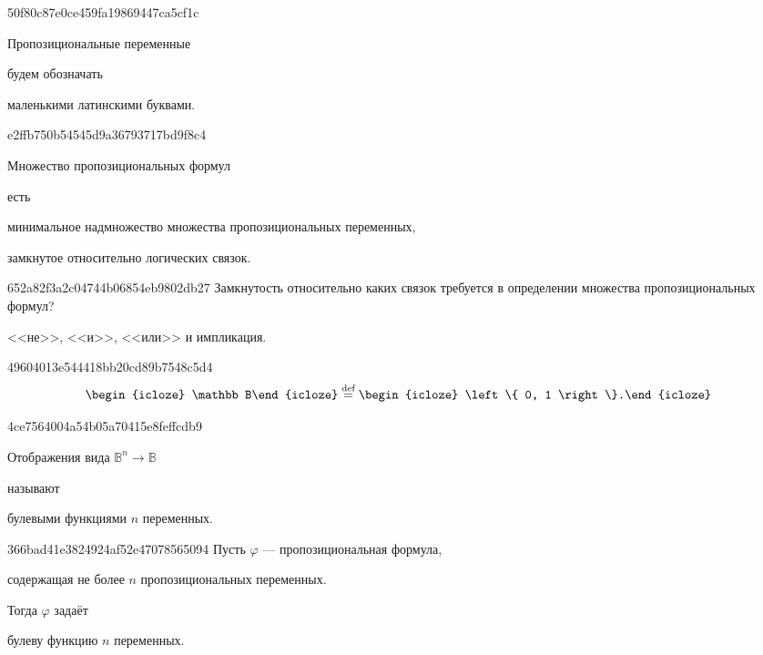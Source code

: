 \begin{note}{50f80c87e0ce459fa19869447ca5cf1c}
    \begin{icloze}{2}Пропозициональные переменные\end{icloze} будем обозначать \begin{icloze}{1}маленькими латинскими буквами.\end{icloze}
\end{note}

\begin{note}{e2ffb750b54545d9a36793717bd9f8c4}
    \begin{icloze}{3}Множество пропозициональных формул\end{icloze} есть \begin{icloze}{2}минимальное надмножество множества пропозициональных переменных,\end{icloze} \begin{icloze}{1}замкнутое относительно логических связок.\end{icloze}
\end{note}

\begin{note}{652a82f3a2c04744b06854eb9802db27}
    Замкнутость относительно каких связок требуется в определении множества пропозициональных формул?

    \begin{cloze}{1}
        <<не>>, <<и>>, <<или>> и импликация.
    \end{cloze}
\end{note}

\begin{note}{49604013e544418bb20cd89b7548c5d4}
    \[
        \begin{icloze}{2}\mathbb B\end{icloze} \overset{\text{def}}= \begin{icloze}{1}\left\{ 0, 1 \right\}.\end{icloze}
    \]
\end{note}

\begin{note}{4ce7564004a54b05a70415e8feffcdb9}
    \begin{icloze}{2}Отображения вида \({ \mathbb B^{n} \to \mathbb B }\)\end{icloze} называют \begin{icloze}{1}булевыми функциями \({ n }\) переменных.\end{icloze}
\end{note}

\begin{note}{366bad41e3824924af52e47078565094}
    Пусть \({ \varphi }\) --- пропозициональная формула, \begin{icloze}{2}содержащая не более \({ n }\) пропозициональных переменных.\end{icloze}
    Тогда \({ \varphi }\) задаёт \begin{icloze}{1}булеву функцию \({ n }\) переменных.\end{icloze}
\end{note}

